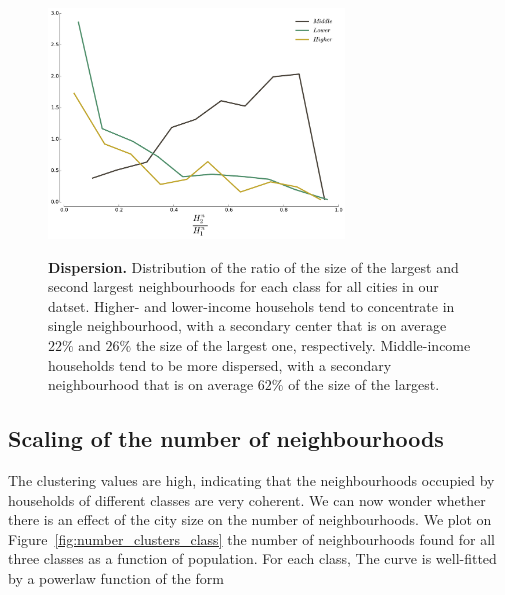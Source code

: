 \begin{figure} 
    \includegraphics[width=0.7\textwidth]{gfx/chapter-segregation/neighbourhoods_polycentrism.pdf}\\
    \caption{{\bf Dispersion.} Distribution of the ratio of the size of the
        largest and second largest neighbourhoods for each class for all cities in our
        datset. Higher- and lower-income househols tend to concentrate in single
        neighbourhood, with a secondary center that is on average $22\%$ and
        $26\%$ the size of the largest one, respectively. Middle-income
        households tend to be more dispersed, with a secondary neighbourhood that is on
        average $62\%$ of the size of the largest.} 
        \label{fig:polycentrism} 
\end{figure}


 \subsection{Scaling of the number of neighbourhoods}
       \label{ssub:dependence_on_city_size}
       
The clustering values are high, indicating that the neighbourhoods occupied by
households of different classes are very coherent. We can now wonder whether
there is an effect of the city size on the number of neighbourhoods. We plot on
Figure~\ref{fig:number_clusters_class} the number of neighbourhoods found for all
three classes as a function of population. For each class, The curve is
well-fitted by a powerlaw function of the form

